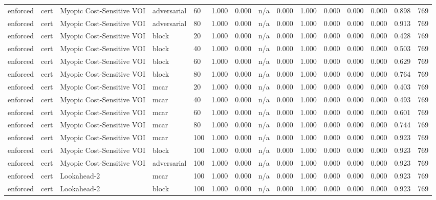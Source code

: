 \begin{table}[!ht]
{\begin{tabular}{lllllllllllllll}
enforced & cert & Myopic Cost-Sensitive VOI & adversarial & 60 & 1.000 & 0.000 & n/a & 0.000 & 1.000 & 0.000 & 0.000 & 0.000 & 0.898 & 769 \\
enforced & cert & Myopic Cost-Sensitive VOI & adversarial & 80 & 1.000 & 0.000 & n/a & 0.000 & 1.000 & 0.000 & 0.000 & 0.000 & 0.913 & 769 \\
enforced & cert & Myopic Cost-Sensitive VOI & block & 20 & 1.000 & 0.000 & n/a & 0.000 & 1.000 & 0.000 & 0.000 & 0.000 & 0.428 & 769 \\
enforced & cert & Myopic Cost-Sensitive VOI & block & 40 & 1.000 & 0.000 & n/a & 0.000 & 1.000 & 0.000 & 0.000 & 0.000 & 0.503 & 769 \\
enforced & cert & Myopic Cost-Sensitive VOI & block & 60 & 1.000 & 0.000 & n/a & 0.000 & 1.000 & 0.000 & 0.000 & 0.000 & 0.629 & 769 \\
enforced & cert & Myopic Cost-Sensitive VOI & block & 80 & 1.000 & 0.000 & n/a & 0.000 & 1.000 & 0.000 & 0.000 & 0.000 & 0.764 & 769 \\
enforced & cert & Myopic Cost-Sensitive VOI & mcar & 20 & 1.000 & 0.000 & n/a & 0.000 & 1.000 & 0.000 & 0.000 & 0.000 & 0.403 & 769 \\
enforced & cert & Myopic Cost-Sensitive VOI & mcar & 40 & 1.000 & 0.000 & n/a & 0.000 & 1.000 & 0.000 & 0.000 & 0.000 & 0.493 & 769 \\
enforced & cert & Myopic Cost-Sensitive VOI & mcar & 60 & 1.000 & 0.000 & n/a & 0.000 & 1.000 & 0.000 & 0.000 & 0.000 & 0.601 & 769 \\
enforced & cert & Myopic Cost-Sensitive VOI & mcar & 80 & 1.000 & 0.000 & n/a & 0.000 & 1.000 & 0.000 & 0.000 & 0.000 & 0.744 & 769 \\
enforced & cert & Myopic Cost-Sensitive VOI & mcar & 100 & 1.000 & 0.000 & n/a & 0.000 & 1.000 & 0.000 & 0.000 & 0.000 & 0.923 & 769 \\
enforced & cert & Myopic Cost-Sensitive VOI & block & 100 & 1.000 & 0.000 & n/a & 0.000 & 1.000 & 0.000 & 0.000 & 0.000 & 0.923 & 769 \\
enforced & cert & Myopic Cost-Sensitive VOI & adversarial & 100 & 1.000 & 0.000 & n/a & 0.000 & 1.000 & 0.000 & 0.000 & 0.000 & 0.923 & 769 \\
enforced & cert & Lookahead-2 & mcar & 100 & 1.000 & 0.000 & n/a & 0.000 & 1.000 & 0.000 & 0.000 & 0.000 & 0.923 & 769 \\
enforced & cert & Lookahead-2 & block & 100 & 1.000 & 0.000 & n/a & 0.000 & 1.000 & 0.000 & 0.000 & 0.000 & 0.923 & 769 \\

\end{tabular}}
\end{table}
